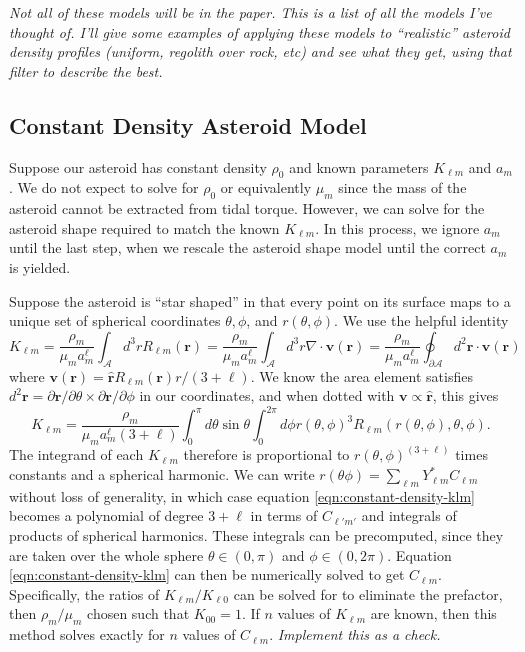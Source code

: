 \documentclass[linenumbers]{aastex631}
\newcommand{\unit}[1]{\hat{\mathbf{#1}}}
\newcommand{\jtd}[1]{{\color{red}\textit{#1}}}
\begin{document}
\jtd{Not all of these models will be in the paper. This is a list of all the models I've thought of. I'll give some examples of applying these models to ``realistic'' asteroid density profiles (uniform, regolith over rock, etc) and see what they get, using that filter to describe the best.}

\subsection{Constant Density Asteroid Model}
Suppose our asteroid has constant density $\rho_0$ and known parameters $K_{\ell m}$ and $a_m$. We do not expect to solve for $\rho_0$ or equivalently $\mu_m$ since the mass of the asteroid cannot be extracted from tidal torque. However, we can solve for the asteroid shape required to match the known $K_{\ell m}$. In this process, we ignore $a_m$ until the last step, when we rescale the asteroid shape model until the correct $a_m$ is yielded.

Suppose the asteroid is ``star shaped'' in that every point on its surface maps to a unique set of spherical coordinates $\theta, \phi$, and $r(\theta, \phi)$. We use the helpful identity
\begin{equation}
  K_{\ell m} = \frac{\rho_m}{\mu_m a_m^\ell} \int_\mathcal{A} d^3 r R_{\ell m} (\mathbf r)
   = \frac{\rho_m}{\mu_m a_m^\ell} \int_\mathcal{A} d^3 r \nabla \cdot \mathbf v (\mathbf r)
    = \frac{\rho_m}{\mu_m a_m^\ell} \oint_{\partial \mathcal{A}} d^2 \mathbf r \cdot \mathbf v (\mathbf r)
\end{equation}
where $\mathbf v (\mathbf r) = \unit r R_{\ell m} (\mathbf r) r / (3+\ell) $. We know the area element satisfies $d^2 \mathbf r = \partial \mathbf r / \partial \theta \times \partial \mathbf r / \partial \phi$ in our coordinates, and when dotted with $\mathbf v \propto \unit r$, this gives
\begin{equation}
  K_{\ell m} = \frac{\rho_m}{\mu_m a_m^\ell(3 + \ell)} \int_0^\pi d\theta \sin \theta\int_0^{2\pi}d\phi r(\theta, \phi)^3 R_{\ell m}(r(\theta, \phi), \theta, \phi).
  \label{eqn:constant-density-klm}
\end{equation}
The integrand of each $K_{\ell m}$ therefore is proportional to $r(\theta, \phi)^(3+\ell)$ times constants and a spherical harmonic. We can write $r(\theta \phi) = \sum_{\ell m} Y_{\ell m}^* C_{\ell m}$ without loss of generality, in which case equation \ref{eqn:constant-density-klm} becomes a polynomial of degree $3+\ell$ in terms of $C_{\ell' m'}$ and integrals of products of spherical harmonics. These integrals can be precomputed, since they are taken over the whole sphere $\theta \in (0, \pi)$ and $\phi \in (0, 2\pi)$. Equation \ref{eqn:constant-density-klm} can then be numerically solved to get $C_{\ell m}$. Specifically, the ratios of $K_{\ell m} / K_{\ell 0}$ can be solved for to eliminate the prefactor, then $\rho_m / \mu_m$ chosen such that $K_{00} = 1$. If $n$ values of $K_{\ell m}$ are known, then this method solves exactly for $n$ values of $C_{\ell m}$.
\jtd{Implement this as a check.}
\end{document}
